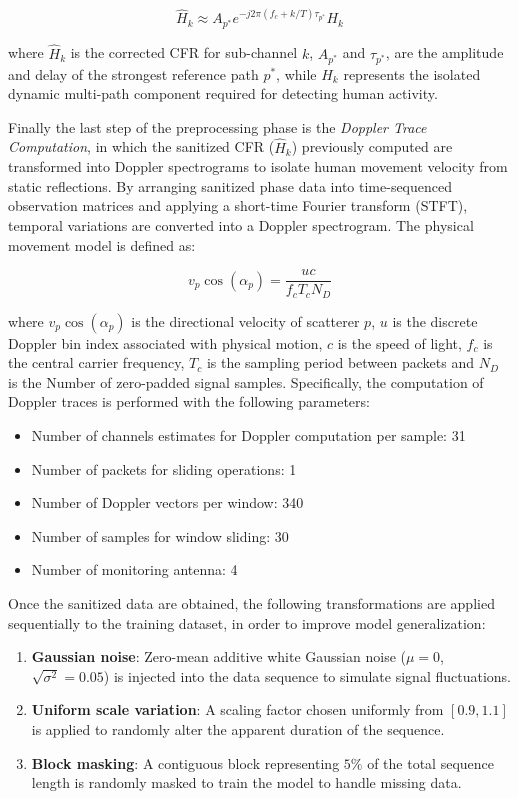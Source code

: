 \[ \hat{H}_{k} \approx A_{p^*}e^{-j2\pi(f_{c}+k/T)\tau_{p^*}} H_{k}\]

where $\hat{H}_{k}$ is the corrected CFR for sub-channel $k$,  $A_{p^*}$ and $\tau_{p^*}$, are the amplitude and delay of the strongest reference path $p^*$, while  $H_{k}$ represents the isolated dynamic multi-path component required for detecting human activity.

Finally the last step of the preprocessing phase is the \textit{Doppler Trace Computation}, in which the sanitized CFR ($\hat{H}_k$) previously computed are transformed into Doppler spectrograms to isolate human movement velocity from static reflections. By arranging sanitized phase data into time-sequenced observation matrices and applying a short-time Fourier transform (STFT), temporal variations are converted into a Doppler spectrogram.
The physical movement model is defined as:

\[ v_{p}\cos(\alpha_{p}) = \frac{uc}{f_{c}T_{c}N_{D}}\]

where $v_{p}\cos(\alpha_{p})$ is the directional velocity of scatterer $p$,  $u$ is the discrete Doppler bin index associated with physical motion, $c$ is the speed of light,  $f_{c}$ is the central carrier frequency, $T_{c}$ is the sampling period between packets and $N_{D}$ is the Number of zero-padded signal samples. Specifically, the computation of Doppler traces is performed with the following parameters:

\begin{itemize}
    \item Number of channels estimates for Doppler computation per sample: 31
    \item Number of packets for sliding operations: 1
    \item Number of Doppler vectors per window: 340
    \item Number of samples for window sliding: 30
    \item Number of monitoring antenna: 4
\end{itemize}

Once the sanitized data are obtained, the following transformations are applied sequentially to the training dataset, in order to improve model generalization:

\begin{enumerate}
    \item \textbf{Gaussian noise}: Zero-mean additive white Gaussian noise ($\mu = 0$, $\sqrt{\sigma^{2}} = 0.05$) is injected into the data sequence to simulate signal fluctuations.
    \item \textbf{Uniform scale variation}: A scaling factor chosen uniformly from $[0.9, 1.1]$ is applied to randomly alter the apparent duration of the sequence.
    \item \textbf{Block masking}: A contiguous block representing $5\%$ of the total sequence length is randomly masked to train the model to handle missing data.
\end{enumerate}

